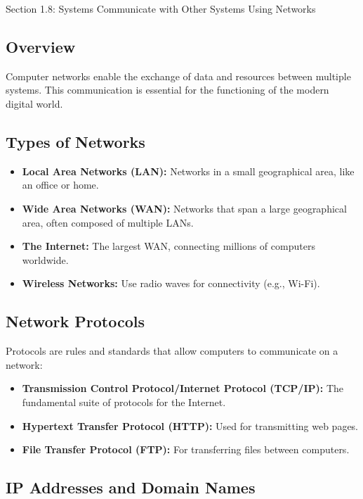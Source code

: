 \begin{notes}{Section 1.8: Systems Communicate with Other Systems Using Networks}
    \subsection*{Overview}

    Computer networks enable the exchange of data and resources between multiple systems. This communication is essential for the functioning of the modern digital world. \vspace*{1em}
    
    \subsection*{Types of Networks}

    \begin{itemize}
        \item \textbf{Local Area Networks (LAN):} Networks in a small geographical area, like an office or home.
        \item \textbf{Wide Area Networks (WAN):} Networks that span a large geographical area, often composed of multiple LANs.
        \item \textbf{The Internet:} The largest WAN, connecting millions of computers worldwide.
        \item \textbf{Wireless Networks:} Use radio waves for connectivity (e.g., Wi-Fi).
    \end{itemize}
    
    \subsection*{Network Protocols}

    Protocols are rules and standards that allow computers to communicate on a network:

    \begin{itemize}
        \item \textbf{Transmission Control Protocol/Internet Protocol (TCP/IP):} The fundamental suite of protocols for the Internet.
        \item \textbf{Hypertext Transfer Protocol (HTTP):} Used for transmitting web pages.
        \item \textbf{File Transfer Protocol (FTP):} For transferring files between computers.
    \end{itemize}
    
    \subsection*{IP Addresses and Domain Names}


\end{notes}
